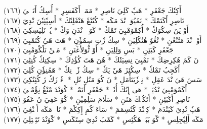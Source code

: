 \documentclass[a4paper, 10pt]{report}
\begin{document}
\begin{center}
\textarabic{(١٦٦) \textcolor{mygreen}{أَكِتٗكَ جَعْفَرِ  * هَپٗ كَلِيَ نَاصِرِ  * مَمَكٖ أَكَفَسِرِ  * أُسِكُ أَتَرٖجٖيَ }} 
\\[5mm] 

\textarabic{(١٦٧) \textcolor{mygreen}{نَاصِرِ أَكَتَمْكَ  * نَمُيُوَ إٖنْدَ مَكَه  * كُتُنْڠَ هَنْڠَلِتٗكَ  * أَسِپٗئِيٗنَ نْدِيَ }} 
\\[5mm] 

\textarabic{(١٦٨) \textcolor{mygreen}{أَوْ يَنَ سِكُوَكٗ  * أُكِمْوَمْبِيَ تَمْكٗ  * كَوَڠٖ وٖنْدَنِ وَكٗ  * يٗتٖ نَلِيَسِكِيَ }} 
\\[5mm] 

\textarabic{(١٦٩) \textcolor{mygreen}{أَوْ وٖنْدَ مَتُنْڠَنِ  * نْڠُوٗ هُتُكُلِيَنِ  * سِكُ زٗتِ سِمُؤٗنِ  * هَتَ هَيٗ كُنَمْبِيَ }} 
\\[5mm] 

\textarabic{(١٧٠) \textcolor{mygreen}{جَعْفَرِ كَبَئِنِ  * بَسِ وَلِلِيَنِ  * أَوْ ٹْوَلِأڠَنَنِ  * مَنٖنٗ نَلٗكْوَمْبِيَ }} 
\\[5mm] 

\textarabic{(١٧١) \textcolor{mygreen}{نَ كَمَ هُكِرِضِكَ  * نَمْبِيَ نِسِيَتٗكَ  * هُنَ هَتَ كُؤُذِكَ  * سِكِتِكٗ كُنِٹِيَ }} 
\\[5mm] 

\textarabic{(١٧٢) \textcolor{mygreen}{أَكَجِبُ تَمْكٗ  * سِكُئِزَ هَيٗ يَكٗ  * سِكُ زٗتٖ نِكٗ  * هَمُنِؤٗنِ كُلِيَ }} 
\\[5mm] 

\textarabic{(١٧٣) \textcolor{mygreen}{سَسَ هَيَ نْدَ عَقِلِ  * نِمٖزٗيَتَأَمَلِ  * نَ كُوَ مَتُلِ تُلِ  * زٖءٗ زَكٗ زَ كُئِنُكِيَ }} 
\\[5mm] 

\textarabic{(١٧٤) \textcolor{mygreen}{أَكَمْوَمْبِيَ نْدُيَكٖ  * هى إِنُكَ أُتٗكٖ  * جَعْفَرِ أَتَمْكٖ  * كْوَنْدَ مْنْڠُ نِؤٗمْبٖيَ }} 
\\[5mm] 

\textarabic{(١٧٥) \textcolor{mygreen}{نَاصِرِ أَكَبَئِنِ  * أَتَكُپٖكَ مَنَنِ  * سَلَامَ سَلِمِيْنِ  * كْوَ عَفِيَ نَ عَفُوَ }} 
\\[5mm] 

\textarabic{(١٧٦) \textcolor{mygreen}{هَپٗ نْدِيَ كَيَنْدَمَ  * كِنٖنْدَ كُتٗسِمَمَ  * سَاءَ كُمِ إِكِكٗمَ  * نَاءٖ مَكَه أَمٖنْڠِيَ }} 
\\[5mm] 

\textarabic{(١٧٧) \textcolor{mygreen}{مَكَه أَلِپٗجِلِسِ  * كْوَ بَبَكٖ هَكُئِسِ  * كَمْبَ نْدِيَ سِتَكَسِ  * كْوَنْدَ تَئِكٖتِلِيَ }} 
\\[5mm] 


\end{center}
\end{document}

